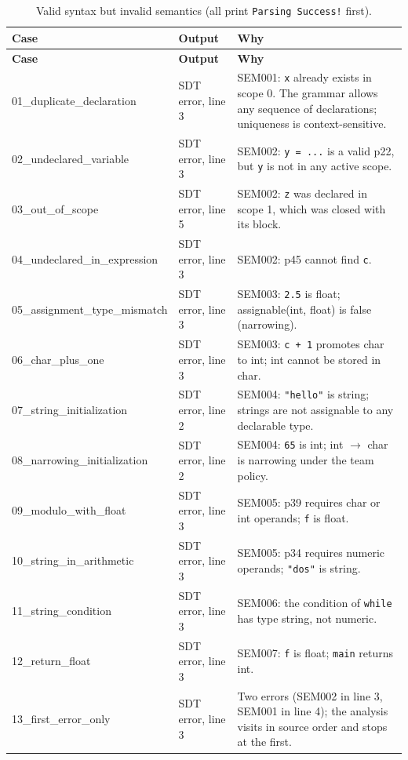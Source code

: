 \documentclass[11pt,letterpaper]{article}
\newcommand{\ok}[1]{\textcolor{okgreen}{\texttt{#1}}}
\begin{document}
{\begin{longtable}{@{}p{3.6cm}p{2.9cm}p{8.6cm}@{}}
\caption{Valid syntax but invalid semantics (all print \ok{Parsing Success!} first).}\\
\toprule
\textbf{Case} & \textbf{Output} & \textbf{Why}\\
\midrule
\endfirsthead
\toprule
\textbf{Case} & \textbf{Output} & \textbf{Why}\\
\midrule
\endhead
01\_\allowbreak{}duplicate\_\allowbreak{}declaration & SDT error, line 3 & SEM001: \texttt{x} already exists in scope 0. The grammar allows any sequence of declarations; uniqueness is context-sensitive. \\
02\_\allowbreak{}undeclared\_\allowbreak{}variable & SDT error, line 3 & SEM002: \texttt{y = ...} is a valid p22, but \texttt{y} is not in any active scope. \\
03\_\allowbreak{}out\_\allowbreak{}of\_\allowbreak{}scope & SDT error, line 5 & SEM002: \texttt{z} was declared in scope 1, which was closed with its block. \\
04\_\allowbreak{}undeclared\_\allowbreak{}in\_\allowbreak{}expression & SDT error, line 3 & SEM002: p45 cannot find \texttt{c}. \\
05\_\allowbreak{}assignment\_\allowbreak{}type\_\allowbreak{}mismatch & SDT error, line 3 & SEM003: \texttt{2.5} is float; assignable(int, float) is false (narrowing). \\
06\_\allowbreak{}char\_\allowbreak{}plus\_\allowbreak{}one & SDT error, line 3 & SEM003: \texttt{c + 1} promotes char to int; int cannot be stored in char. \\
07\_\allowbreak{}string\_\allowbreak{}initialization & SDT error, line 2 & SEM004: \texttt{"hello"} is string; strings are not assignable to any declarable type. \\
08\_\allowbreak{}narrowing\_\allowbreak{}initialization & SDT error, line 2 & SEM004: \texttt{65} is int; int $\to$ char is narrowing under the team policy. \\
09\_\allowbreak{}modulo\_\allowbreak{}with\_\allowbreak{}float & SDT error, line 3 & SEM005: p39 requires char or int operands; \texttt{f} is float. \\
10\_\allowbreak{}string\_\allowbreak{}in\_\allowbreak{}arithmetic & SDT error, line 3 & SEM005: p34 requires numeric operands; \texttt{"dos"} is string. \\
11\_\allowbreak{}string\_\allowbreak{}condition & SDT error, line 3 & SEM006: the condition of \texttt{while} has type string, not numeric. \\
12\_\allowbreak{}return\_\allowbreak{}float & SDT error, line 3 & SEM007: \texttt{f} is float; \texttt{main} returns int. \\
13\_\allowbreak{}first\_\allowbreak{}error\_\allowbreak{}only & SDT error, line 3 & Two errors (SEM002 in line 3, SEM001 in line 4); the analysis visits in source order and stops at the first. \\
\bottomrule
\end{longtable}

}
\end{document}
